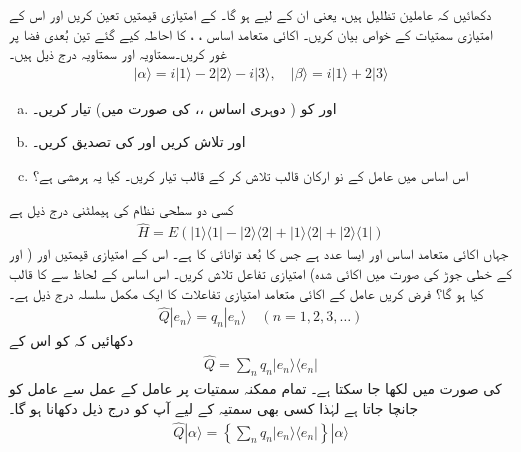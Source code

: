  
دکھائیں کہ عاملین تظلیل  ہیں، یعنی ان کے لیے ہو گا۔  کے امتیازی قیمتیں تعین کریں اور اس کے امتیازی سمتیات کے خواص بیان کریں۔
 اکائی متعامد اساس ، ،  کا احاطہ کیے گئے تین بُعدی فضا پر غور کریں۔سمتاویہ  اور سمتاویہ  درج ذیل ہیں۔ 
\begin{align*}
| \alpha \rangle = i | 1 \rangle -2|2\rangle -i|3\rangle , \quad | \beta \rangle = i|1\rangle +2|3\rangle 
\end{align*}
\begin{enumerate}[a.]
\item
  اور  کو ( دوہری اساس ،،  کی صورت میں) تیار کریں۔ 
\item
  اور  تلاش کریں اور  کی تصدیق کریں۔
\item
 اس اساس میں عامل  کے نو ارکان قالب تلاش کر کے قالب  تیار کریں۔ کیا یہ ہرمشی ہے؟
\end{enumerate} 
کسی دو سطحی نظام کی ہیملٹنی درج ذیل ہے 
\begin{align*}
\hat{H} = E( | 1 \rangle \langle 1 | - |2\rangle \langle 2 | + | 1 \rangle \langle 2 | + | 2 \rangle \langle 1 | )
\end{align*}
جہاں  اکائی متعامد اساس اور  ایسا عدد ہے جس کا بُعد توانائی کا ہے۔ اس کے امتیازی قیمتیں اور (  اور  کے خطی جوڑ کی صورت میں اکائی شدہ) امتیازی تفاعل تلاش کریں۔ اس اساس کے لحاظ سے  کا قالب  کیا ہو گا؟ 
 فرض کریں عامل  کے اکائی متعامد امتیازی تفاعلات کا ایک مکمل سلسلہ درج ذیل ہے۔ 
\begin{align*}
\hat{Q}|e_{n} \rangle = q_{n} | e_{n} \rangle \quad (n = 1,2,3,\dotsc )
\end{align*}
دکھائیں کہ  کو اس کے
\begin{align*}
\hat{Q} = \sum_{n} q_{n} | e_{n} \rangle \langle e_{n} |
\end{align*}
 کی صورت میں لکھا جا سکتا ہے۔  \quad 
 تمام ممکنہ سمتیات پر عامل کے عمل سے عامل کو جانچا جاتا ہے لہٰذا کسی بھی سمتیہ  کے لیے آپ کو درج ذیل دکھانا ہو گا۔ 
\begin{align*}
\hat{Q} | \alpha \rangle = \left\{ \sum_{n} q_{n} | e_{n} \rangle \langle e_{n} | \right\} | \alpha \rangle 
\end{align*}

